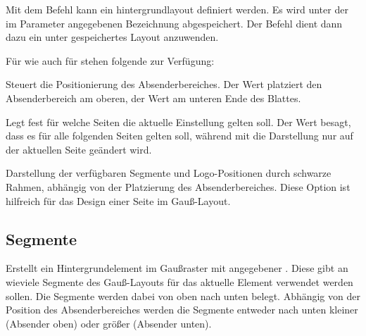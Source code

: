Mit dem Befehl  kann ein hintergrundlayout definiert werden.
Es wird unter der im Parameter  angegebenen Bezeichnung
abgespeichert.
Der Befehl  dient dann dazu ein unter  gespeichertes
Layout anzuwenden.


Für  wie auch für  stehen folgende
 zur Verfügung:

\begin{Declaration}
\end{Declaration}

Steuert die Positionierung des Absenderbereiches.
Der Wert  platziert den Absenderbereich am oberen,
der Wert  am unteren Ende des Blattes.

\begin{Declaration}
\end{Declaration}

Legt fest für welche Seiten die aktuelle Einstellung gelten soll.
Der Wert  besagt, dass es für alle folgenden Seiten gelten soll,
während mit  die Darstellung nur auf der aktuellen Seite geändert 
wird.

\begin{Declaration}
\end{Declaration}

Darstellung der verfügbaren Segmente und Logo-Positionen durch schwarze Rahmen, abhängig von der Platzierung des Absenderbereiches.
Diese Option ist hilfreich für das Design einer Seite im Gauß-Layout.


\subsection{Segmente}\label{sec:gausspage:bgsegment}

\begin{Declaration}
\end{Declaration}

Erstellt ein Hintergrundelement im Gaußraster mit angegebener .
Diese gibt an wieviele Segmente des Gauß-Layouts für das aktuelle Element
verwendet werden sollen.
Die Segmente werden dabei von oben nach unten belegt.
Abhängig von der Position des Absenderbereiches werden die Segmente
entweder nach unten kleiner (Absender oben) oder größer (Absender unten).

